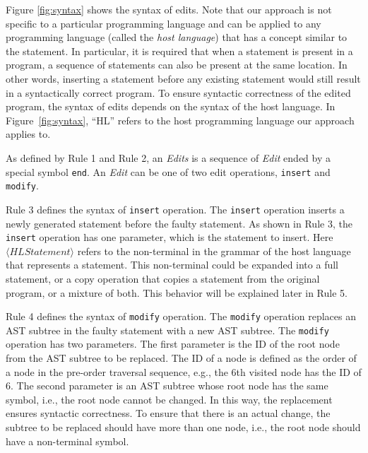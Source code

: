Figure \ref{fig:syntax} shows the syntax of edits. %
Note that our approach is not specific to a particular programming language and can be applied to any programming language (called the \emph{host language}) that has a concept similar to the statement. In particular, it is required that when a statement is present in a program, a sequence of statements can also be present at the same location. In other words, inserting a statement before any existing statement would still result in a syntactically correct program. 
To ensure syntactic correctness of the edited program, the syntax of edits depends on the syntax of the host language. In Figure~\ref{fig:syntax}, ``HL'' refers to the host programming language our approach applies to.  

As defined by Rule 1 and Rule 2, an {\it Edits} is a sequence of {\it Edit} ended by a special symbol {\tt end}. An {\it Edit} can be one of two edit operations, {\tt insert} and {\tt modify}.

Rule 3 defines the syntax of {\tt insert} operation. The \texttt{insert} operation inserts a newly generated statement before the faulty statement. As shown in Rule 3, the {\tt insert} operation has one parameter, which is the statement to insert. Here $\langle HLStatement\rangle$ refers to the non-terminal in the grammar of the host language that represents a statement. This non-terminal could be expanded into a full statement, or a copy operation that copies a statement from the original program, or a mixture of both. This behavior will be explained later in Rule 5.

Rule 4 defines the syntax of {\tt modify} operation. The \texttt{modify} operation replaces an AST subtree in the faulty statement with a new AST subtree. The {\tt modify} operation has two parameters. The first parameter is the ID of the root node from the AST subtree to be replaced. The ID of a node is defined as the order of a node in the pre-order traversal sequence, e.g., the 6th visited node has the ID of 6. 
The second parameter is an AST subtree whose root node has the same symbol, i.e., the root node cannot be changed. In this way, the replacement ensures syntactic correctness. To ensure that there is an actual change, the subtree to be replaced should have more than one node, i.e., the root node should have a non-terminal symbol. 

